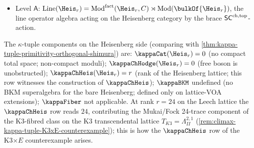 \begin{example}
\begin{itemize}
algebra at generic level
\cite[\S 3.4 free-boson rigidity]{FBZ04}.
\item Level $\mathsf{A}$: $\mathrm{Line}(\Heis_r)
= \mathrm{Mod}^{\mathrm{fact}}(\Heis_r, C)
\rtimes \mathrm{Mod}(\bulkOf{\Heis_r})$, the line operator
algebra acting on the Heisenberg category by the brace
$\mathsf{SC}^{\mathrm{ch},\mathrm{top}}$-action.
\end{itemize}
The $\kappa$-tuple components on the Heisenberg side
\textup(comparing with \cref{thm:kappa-tuple-primitivity-orthogonal-shimura}\textup) are:
$\kappaCat(\Heis_r) = 0$ \textup(no compact total space; non-compact
moduli\textup); $\kappaChHodge(\Heis_r) = 0$ \textup(free
boson is unobstructed\textup); $\kappaChHeis(\Heis_r) = r$
\textup(rank of the Heisenberg lattice; this row witnesses the
construction of $\kappaChHeis$\textup); $\kappaBKM$ undefined
\textup(no BKM superalgebra for the bare Heisenberg; defined only
on lattice-VOA extensions\textup); $\kappaFiber$ not applicable.
At rank $r = 24$ on the Leech lattice the $\kappaChHeis$ row reads
$24$, contributing the Mukai/Fock 24-trace component of the
K3-fibred class on the K3 transcendental lattice
$T_{K3} = \Lambda^{2,1}_{II}$
\textup(\cref{rem:climax-kappa-tuple-K3xE-counterexample}\textup);
this is how the $\kappaChHeis$ row of the K3$\times E$ counterexample
arises.
\end{example}

